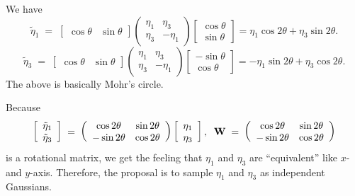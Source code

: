 \documentclass[12pt]{article}
\begin{document}
We have 
\begin{equation}
 \tilde{\eta}_1 \;=\; 
\left[\begin{array}{cc}
\cos\theta & \sin\theta
\end{array}\right]
\left(\begin{array}{cc}
\eta_1 & \eta_3\\
\eta_3 & -\eta_1
\end{array}\right)
\left[\begin{array}{c}
\cos\theta\\
\sin\theta
\end{array}\right] = {\eta}_1\cos 2\theta + {\eta}_3 \sin 2\theta.
\end{equation}
\begin{equation}
 \tilde{\eta}_3 \;=\; 
\left[\begin{array}{cc}
\cos\theta & \sin\theta
\end{array}\right]
\left(\begin{array}{cc}
\eta_1 & \eta_3\\
\eta_3 & -\eta_1
\end{array}\right)
\left[\begin{array}{c}
-\sin\theta\\
\cos\theta
\end{array}\right] = -{\eta}_1\sin 2\theta + {\eta}_3 \cos 2\theta.
\end{equation}
The above is basically Mohr's circle.

Because 
\begin{equation}
 \left[\begin{array}{c}
\tilde{\eta}_1\\
\tilde{\eta}_3
\end{array}\right] \;=\; \left(\begin{array}{cc}
\cos2\theta & \sin2\theta\\
-\sin2\theta &  \cos2\theta
\end{array}\right)
\left[\begin{array}{c}
{\eta}_1\\
{\eta}_3
\end{array}\right], \;\;
 {\bf W} \;=\; \left(\begin{array}{cc}
\cos2\theta & \sin2\theta\\
-\sin2\theta &  \cos2\theta
\end{array}\right)
\end{equation}
is a rotational matrix, we get the feeling that ${\eta}_1$ and
${\eta}_3$ are ``equivalent'' like $x$- and $y$-axis.  Therefore, the
proposal is to sample ${\eta}_1$ and ${\eta}_3$ as independent
Gaussians.
\end{document}
